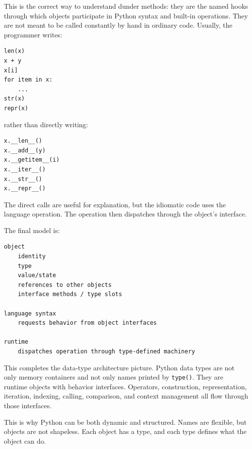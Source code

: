 This is the correct way to understand dunder methods: they are the named hooks through which objects participate in Python syntax and built-in operations. They are not meant to be called constantly by hand in ordinary code. Usually, the programmer writes:

\begin{verbatim}
len(x)
x + y
x[i]
for item in x:
    ...
str(x)
repr(x)
\end{verbatim}

rather than directly writing:

\begin{verbatim}
x.__len__()
x.__add__(y)
x.__getitem__(i)
x.__iter__()
x.__str__()
x.__repr__()
\end{verbatim}

The direct calls are useful for explanation, but the idiomatic code uses the language operation. The operation then dispatches through the object's interface.

The final model is:

\begin{verbatim}
object
    identity
    type
    value/state
    references to other objects
    interface methods / type slots

language syntax
    requests behavior from object interfaces

runtime
    dispatches operation through type-defined machinery
\end{verbatim}

This completes the data-type architecture picture. Python data types are not only memory containers and not only names printed by \texttt{type()}. They are runtime objects with behavior interfaces. Operators, construction, representation, iteration, indexing, calling, comparison, and context management all flow through those interfaces.

This is why Python can be both dynamic and structured. Names are flexible, but objects are not shapeless. Each object has a type, and each type defines what the object can do.